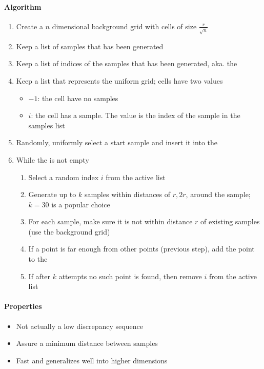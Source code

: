   \paragraph{Algorithm}
  \begin{enumerate}
    \item Create a $ n $ dimensional background grid with cells of size
    $ \frac{r}{\sqrt{n}} $
    \item Keep a list of samples that has been generated
    \item Keep a list of indices of the samples that has been generated, aka.
    the 
    \item Keep a list that represents the uniform grid; cells have two values
    \begin{itemize}
      \item $ -1 $: the cell have no samples
      \item $ i $: the cell has a sample. The value is the index of the sample
      in the samples list
    \end{itemize}

    \item Randomly, uniformly select a start sample and insert it into the
    \item While the  is not empty
    \begin{enumerate}
      \item Select a random index $ i $ from the active list
      \item Generate up to $ k $ samples within distances of $ r, 2r $,
      around the sample; $ k = 30 $ is a popular choice
      \item For each sample, make sure it is not within distance $ r $ of
      existing samples (use the background grid)
      \item If a point is far enough from other points (previous step), add
      the point to the 
      \item If after $ k $ attempts no such point is found, then remove $ i $
      from the active list
    \end{enumerate}
  \end{enumerate}

  \paragraph{Properties}
  \begin{itemize}
    \item Not actually a low discrepancy sequence
    \item Assure a minimum distance between samples
    \item Fast and generalizes well into higher dimensions
  \end{itemize}
